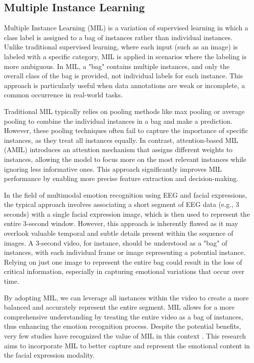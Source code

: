 \subsection{Multiple Instance Learning}
Multiple Instance Learning (MIL) is a variation of supervised learning in which a class label is assigned to a bag of instances rather than individual instances. Unlike traditional supervised learning, where each input (such as an image) is labeled with a specific category, MIL is applied in scenarios where the labeling is more ambiguous. In MIL, a "bag" contains multiple instances, and only the overall class of the bag is provided, not individual labels for each instance. This approach is particularly useful when data annotations are weak or incomplete, a common occurrence in real-world tasks.

Traditional MIL typically relies on pooling methods like max pooling or average pooling to combine the individual instances in a bag and make a prediction. However, these pooling techniques often fail to capture the importance of specific instances, as they treat all instances equally. In contrast, attention-based MIL (AMIL) \cite{amil}introduces an attention mechanism that assigns different weights to instances, allowing the model to focus more on the most relevant instances while ignoring less informative ones. This approach significantly improves MIL performance by enabling more precise feature extraction and decision-making.

In the field of multimodal emotion recognition using EEG and facial expressions, the typical approach involves associating a short segment of EEG data (e.g., 3 seconds) with a single facial expression image, which is then used to represent the entire 3-second window. However, this approach is inherently flawed as it may overlook valuable temporal and subtle details present within the sequence of images. A 3-second video, for instance, should be understood as a "bag" of instances, with each individual frame or image representing a potential instance. Relying on just one image to represent the entire bag could result in the loss of critical information, especially in capturing emotional variations that occur over time.

By adopting MIL, we can leverage all instances within the video to create a more balanced and accurately represent the entire segment. MIL allows for a more comprehensive understanding by treating the entire video as a bag of instances, thus enhancing the emotion recognition process. Despite the potential benefits, very few studies have recognized the value of MIL in this context \cite{rao2016multi,romeo2019multiple}. This research aims to incorporate MIL to better capture and represent the emotional content in the facial expression modality.

